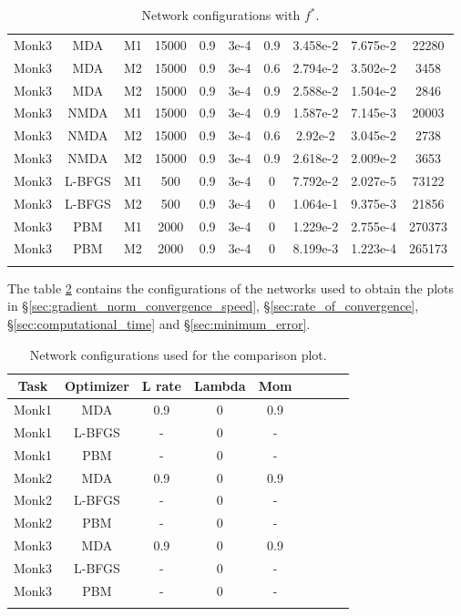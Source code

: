 \begin{center}
\begin{longtable}{|c|c|c|c|c|c|c|c|c|c|}
			Monk3 & MDA & M1 & 15000 & 0.9 & 3e-4  & 0.9 & 3.458e-2 & 7.675e-2 & 22280 \\
			Monk3 & MDA & M2 & 15000 & 0.9 & 3e-4  & 0.6 & 2.794e-2 & 3.502e-2 & 3458 \\
			Monk3 & MDA & M2 & 15000 & 0.9 & 3e-4  & 0.9 &  2.588e-2 & 1.504e-2 & 2846  \\
			Monk3 & NMDA & M1 & 15000 & 0.9 & 3e-4  & 0.9 & 1.587e-2 & 7.145e-3 & 20003 \\
			Monk3 & NMDA & M2 & 15000 & 0.9 & 3e-4  & 0.6 & 2.92e-2 & 3.045e-2 & 2738 \\
			Monk3 & NMDA & M2 & 15000 & 0.9 & 3e-4  & 0.9 & 2.618e-2 & 2.009e-2 & 3653 \\
			Monk3 & L-BFGS & M1 & 500 & 0.9 & 3e-4  & 0 & 7.792e-2 & 2.027e-5 & 73122 \\
			Monk3 & L-BFGS & M2 & 500 & 0.9 & 3e-4  & 0 & 1.064e-1 & 9.375e-3 & 21856 \\
			Monk3 & PBM & M1 & 2000 & 0.9 & 3e-4  & 0 & 1.229e-2 & 2.755e-4 & 270373 \\
			Monk3 & PBM & M2 & 2000 & 0.9 & 3e-4  & 0 & 8.199e-3 & 1.223e-4 & 265173  \\
			\hline
			\caption{Network configurations with $f^*$.}
			\label{tab:nets_res}
		\end{longtable}

\end{center}

The table \ref{tab:nets_comp} contains the configurations of the networks used to obtain the plots in \S \ref{sec:gradient_norm_convergence_speed}, \S \ref{sec:rate_of_convergence}, \S \ref{sec:computational_time} and \S \ref{sec:minimum_error}. 

\begin{center}
	\small\addtolength{\tabcolsep}{-3pt}
	\centering
	\begin{longtable}{|c|c|c|c|c|c|c|c|c|}
		\hline
		\textbf{Task}& \textbf{Optimizer} & \textbf{L rate} & \multicolumn{1}{l|}{\textbf{Lambda}} & \textbf{Mom}  \\ \hline 
		Monk1 & MDA & 0.9 & 0 & 0.9    \\
		Monk1 & L-BFGS & - & 0 & -    \\
		Monk1 & PBM & - & 0 & -    \\
		Monk2 & MDA & 0.9 & 0 & 0.9    \\
		Monk2 & L-BFGS & - & 0 & -    \\
		Monk2 & PBM & - & 0 & -    \\
		Monk3 & MDA & 0.9 & 0 & 0.9    \\
		Monk3 & L-BFGS & - & 0 & -    \\
		Monk3 & PBM & - & 0 & -    \\
		\hline
		\caption{Network configurations used for the comparison plot.}
		\label{tab:nets_comp}
	\end{longtable}
\end{center}



